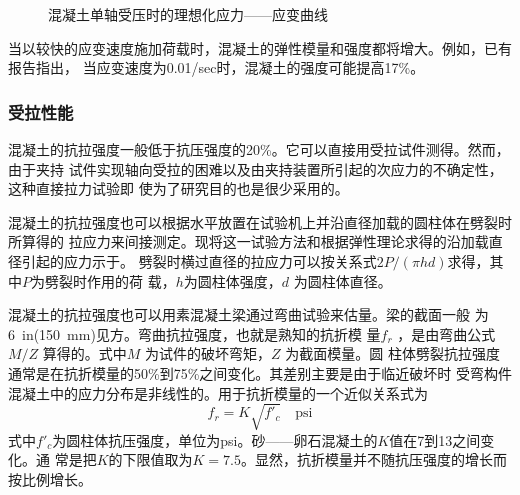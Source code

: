\documentclass[12pt,a4paper]{book}
\begin{document}
\begin{figure}[htbp] \centering
  \caption{混凝土单轴受压时的理想化应力——应变曲线}
  \label{fig:1}
\end{figure}

当以较快的应变速度施加荷载时，混凝土的弹性模量和强度都将增大。例如，已有报告指出，
当应变速度为0.01/sec时，混凝土的强度可能提高17\%。

\subsubsection{受拉性能}

混凝土的抗拉强度一般低于抗压强度的20\%。它可以直接用受拉试件测得。然而，由于夹持
试件实现轴向受拉的困难以及由夹持装置所引起的次应力的不确定性，这种直接拉力试验即
使为了研究目的也是很少采用的。

混凝土的抗拉强度也可以根据水平放置在试验机上并沿直径加载的圆柱体在劈裂时所算得的
拉应力来间接测定。现将这一试验方法和根据弹性理论求得的沿加载直径引起的应力示于。
劈裂时横过直径的拉应力可以按关系式$2P/(\pi hd)$求得，其中$P$为劈裂时作用的荷
载，$h$为圆柱体强度，$d$ 为圆柱体直径。

混凝土的抗拉强度也可以用素混凝土梁通过弯曲试验来估量。梁的截面一般
为\SI{6}{in}(\SI{150}{\milli\meter})见方。弯曲抗拉强度，也就是熟知的抗折模
量$f_r$ ，是由弯曲公式$M/Z$ 算得的。式中$M$ 为试件的破坏弯矩，$Z$ 为截面模量。圆
柱体劈裂抗拉强度通常是在抗折模量的50\%到75\%之间变化。其差别主要是由于临近破坏时
受弯构件混凝土中的应力分布是非线性的。用于抗折模量的一个近似关系式为
\begin{equation}
  \label{eq:32}
  f_r=K\sqrt{f'_c} \quad \mathrm{psi}
\end{equation}
式中$f'_c$为圆柱体抗压强度，单位为psi。砂——卵石混凝土的$K$值在7到13之间变化。通
常是把$K$的下限值取为$K=7.5$。显然，抗折模量并不随抗压强度的增长而按比例增长。
\end{document}
